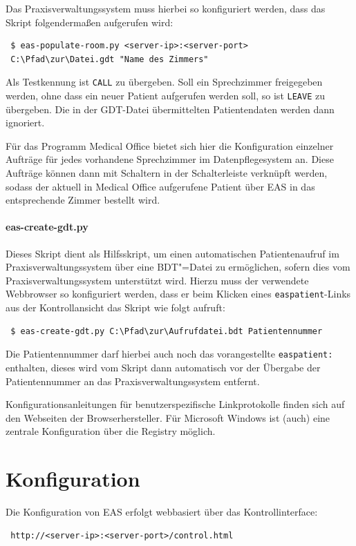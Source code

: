 \documentclass[a4paper,10pt]{scrreprt}
\begin{document}
Das Praxisverwaltungssystem muss hierbei so konfiguriert werden, dass das Skript folgendermaßen aufgerufen wird:
\begin{lstlisting}
 $ eas-populate-room.py <server-ip>:<server-port> 
 C:\Pfad\zur\Datei.gdt "Name des Zimmers"
\end{lstlisting}
Als Testkennung ist \texttt{CALL} zu übergeben. Soll ein Sprechzimmer freigegeben werden, ohne dass ein neuer Patient aufgerufen werden soll, so ist \texttt{LEAVE} zu übergeben. Die in der GDT-Datei übermittelten Patientendaten werden dann ignoriert.

Für das Programm Medical Office bietet sich hier die Konfiguration einzelner Aufträge für jedes vorhandene Sprechzimmer im Datenpflegesystem an. Diese Aufträge können dann mit Schaltern in der Schalterleiste verknüpft werden,
sodass der aktuell in Medical Office aufgerufene Patient über EAS in das entsprechende Zimmer bestellt wird.

\subsubsection{eas-create-gdt.py}
Dieses Skript dient als Hilfsskript, um einen automatischen Patientenaufruf im Praxisverwaltungssystem über eine BDT"=Datei zu ermöglichen, sofern dies vom Praxisverwaltungssystem unterstützt wird. Hierzu muss der verwendete Webbrowser so konfiguriert werden,
dass er beim Klicken eines \texttt{easpatient}-Links aus der Kontrollansicht das Skript wie folgt aufruft:
\begin{lstlisting}
 $ eas-create-gdt.py C:\Pfad\zur\Aufrufdatei.bdt Patientennummer
\end{lstlisting}
Die Patientennummer darf hierbei auch noch das vorangestellte \texttt{easpatient:} enthalten, dieses wird vom Skript dann automatisch vor der Übergabe der Patientennummer an das Praxisverwaltungssystem entfernt.

Konfigurationsanleitungen für benutzerspezifische Linkprotokolle finden sich auf den Webseiten der Browserhersteller. Für Microsoft Windows ist (auch) eine zentrale Konfiguration über die Registry möglich.

\chapter{Konfiguration}
Die Konfiguration von EAS erfolgt webbasiert über das Kontrollinterface:
\begin{lstlisting}
 http://<server-ip>:<server-port>/control.html
\end{lstlisting}
\end{document}
